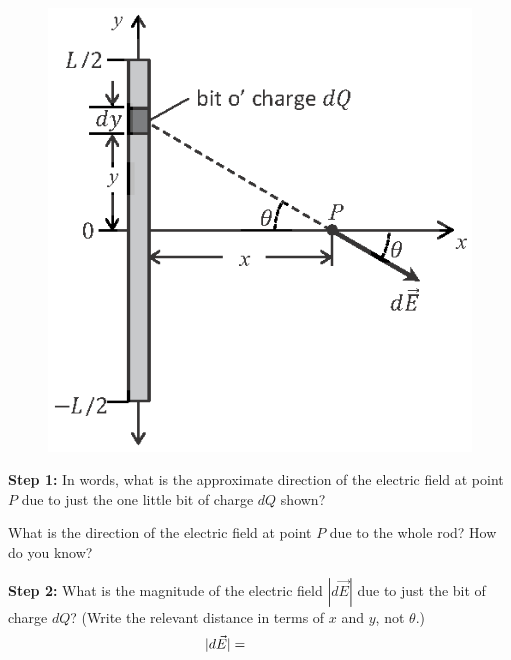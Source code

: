\begin{figure}
\vspace{-.55in}
   \includegraphics{electric_field_near_a_charged_rod/fig2.eps}
\end{figure}


\par
\vspace{0.5cm}
\par
\textbf{Step 1:} \newline
In words, what is the approximate direction of the electric field at point $P$ due to just the one little bit of charge $dQ$ shown?

\vspace{.6in}

What is the direction of the electric field at point $P$ due to the whole rod?  How do you know?

\vspace{.6in}

\textbf{Step 2:} \newline
What is the magnitude of the electric field $|d\vec{E}|$  due to just the bit of charge $dQ$?  (Write the relevant distance in terms of $x$ and $y$, not $\theta$.)
\[
|d\vec{E}|=\hspace{0.7in}
\]
\vspace{.3in}

